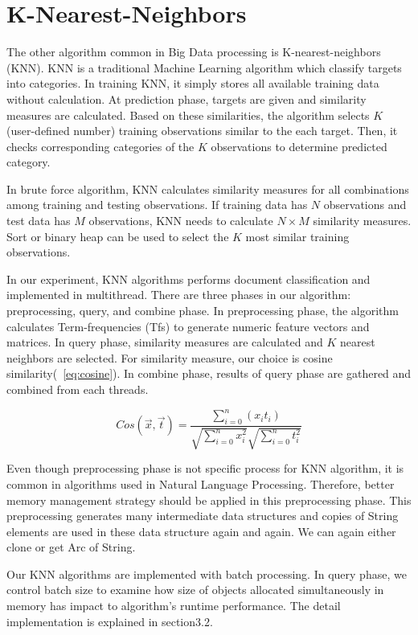 \section{K-Nearest-Neighbors}
\label{sec:concept_knn}
The other algorithm common in Big Data processing is K-nearest-neighbors (KNN). KNN is a traditional Machine Learning algorithm which classify targets into categories. 
In training KNN, it simply stores all available training data without calculation. At prediction phase, targets are given and similarity measures are calculated. 
Based on these similarities, the algorithm selects \(K\) (user-defined number) training observations similar to the each target. 
Then, it checks corresponding categories of the \(K\) observations to determine predicted category. 

In brute force algorithm, KNN calculates similarity measures for all combinations among training and testing observations. 
If training data has \(N\) observations and test data has \(M\) observations, KNN needs to calculate \(N \times M\) similarity measures. 
Sort or binary heap can be used to select the \(K\) most similar training observations.

In our experiment, KNN algorithms performs document classification and implemented in multithread. 
There are three phases in our algorithm: preprocessing, query, and combine phase. 
In preprocessing phase, the algorithm calculates Term-frequencies (Tfs) to generate numeric feature vectors and matrices. 
In query phase, similarity measures are calculated and \(K\) nearest neighbors are selected. 
For similarity measure, our choice is cosine similarity(~\ref{eq:cosine}). 
In combine phase, results of query phase are gathered and combined from each threads.

\begin{equation} \label{eq:cosine}
    Cos(\vec{x}, \vec{t})
     = \frac{\sum_{i=0}^{n} (x_i t_i)}{\sqrt{\sum_{i=0}^{n} x_i^2}\sqrt{\sum_{i=0}^{n} t_i^2}}
\end{equation}

Even though preprocessing phase is not specific process for KNN algorithm, 
it is common in algorithms used in Natural Language Processing. Therefore, better memory management strategy should be applied in this preprocessing phase.
This preprocessing generates many intermediate data structures and copies of String elements are used in these data structure again and again. 
We can again either clone or get Arc of String. 

Our KNN algorithms are implemented with batch processing. In query phase, we control batch size to examine how size of objects allocated simultaneously in memory has impact to algorithm's runtime performance.
The detail implementation is explained in section3.2.

